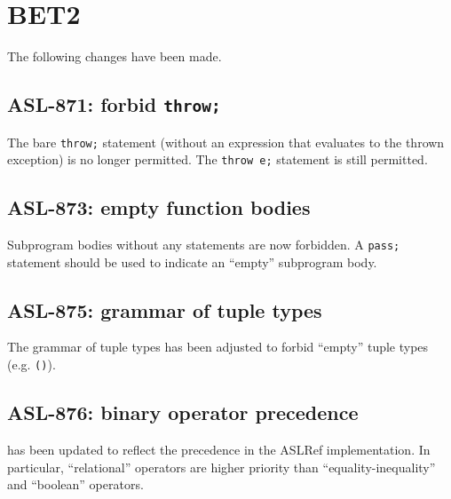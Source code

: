 \section{BET2}

The following changes have been made.

\subsection{ASL-871: forbid \texttt{throw;}}

The bare \texttt{throw;} statement (without an expression that evaluates to the thrown exception) is no longer permitted.
The \texttt{throw e;} statement is still permitted.

\subsection{ASL-873: empty function bodies}

Subprogram bodies without any statements are now forbidden.
A \texttt{pass;} statement should be used to indicate an ``empty'' subprogram body.

\subsection{ASL-875: grammar of tuple types}

The grammar of tuple types has been adjusted to forbid ``empty'' tuple types (e.g. \texttt{()}).

\subsection{ASL-876: binary operator precedence}

 has been updated to reflect the precedence in the ASLRef implementation.
In particular, ``relational'' operators are higher priority than ``equality-inequality'' and ``boolean'' operators.
